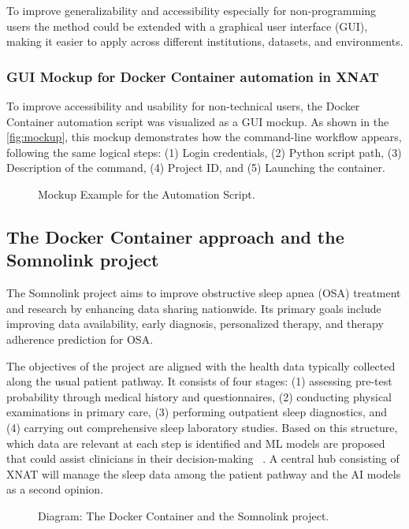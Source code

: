 To improve generalizability and accessibility especially for non-programming users the method could be extended with a graphical user interface (GUI), making it easier to apply across different institutions, datasets, and environments. 
\normalsize
\subsubsection{GUI Mockup for Docker Container automation in XNAT}
\normalsize
To improve accessibility and usability for non-technical users, the Docker Container  automation script was visualized as a GUI mockup. As shown in the \autoref{fig:mockup}, this mockup demonstrates how the command-line workflow appears, following the same logical steps: (1) Login credentials, (2) Python script path, (3) Description of the command, (4) Project ID, and (5) Launching the container.
\normalsize
\begin{figure}[H]
    \centering
    \def\svgwidth{\linewidth} 
    
    \caption{ Mockup Example for the Automation Script.}
    \label{fig:mockup}
\end{figure}
\normalsize
\subsection{The Docker Container approach and the Somnolink project}

The Somnolink project aims to improve obstructive sleep apnea (OSA) treatment and research by enhancing data sharing nationwide. Its primary goals include improving data availability, early diagnosis, personalized therapy, and therapy adherence prediction for OSA.

The objectives of the project are aligned with the health data typically collected along the usual patient pathway. It consists of four stages: (1) assessing pre-test probability through medical history and questionnaires, (2) conducting physical examinations in primary care, (3) performing outpatient sleep diagnostics, and (4) carrying out comprehensive sleep laboratory studies. Based on this structure, which data are relevant at each step is identified and ML models are proposed that could assist clinicians in their decision-making ~\cite{krefting_somnolink_2025}. A central hub consisting of XNAT will manage the sleep data among the patient pathway and the AI models as a second opinion.
\begin{figure}[H]
    \centering
    \def\svgwidth{\linewidth} 
    
    \caption{Diagram: The Docker Container and the Somnolink project.}
    \label{fig:somnolink}
\end{figure}

